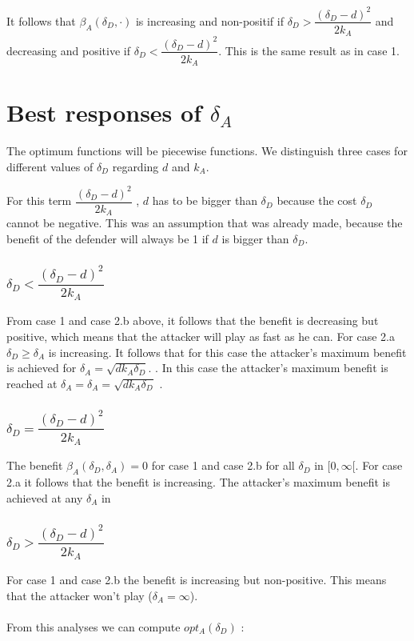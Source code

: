 It follows that $\beta_{A}(\delta_{D},\cdot)$ is increasing and non-positif if $\delta_{D} > \dfrac{(\delta_{D}-d)^{2}}{2k_{A}}$ and decreasing and positive if $\delta_{D} < \dfrac{(\delta_{D}-d)^{2}}{2k_{A}}$. This is the same result as in case 1.\\


\section{Best responses of $\delta_{A}$}
The optimum functions will be piecewise functions. We distinguish three cases for different values of $\delta_{D}$ regarding $d$ and $k_{A}$. 


For this term $\dfrac{(\delta_{D}-d)^{2}}{2k_{A}} $ , $d$ has to be bigger than  $\delta_{D}$ because the cost $\delta_{D}$ cannot be negative. This was an assumption that was already made, because the benefit of the defender will always be 1 if $d$ is bigger than  $\delta_{D}$.

\subsubsection*{$\delta_{D} < \dfrac{(\delta_{D}-d)^{2}}{2k_{A}}$} 
From case 1 and case 2.b above, it follows that the benefit is decreasing but positive, which means that the attacker will play as fast as he can. For case 2.a  $\delta_{D} \geq \delta_{A}$ is increasing. It follows that for this case the attacker's maximum benefit is achieved for $\delta_{A} = \sqrt{d k_{A}\delta_{D}}$.
. In this case the attacker's maximum benefit is reached at $\delta_{A} = \delta_{A} = \sqrt{dk_{A}\delta_{D}}$  .
\subsubsection*{$\delta_{D} = \dfrac{(\delta_{D}-d)^{2}}{2k_{A}}$} 
The benefit $\beta_{A}(\delta_{D},\delta_{A})=0$ for case 1 and case 2.b for all $\delta_{D}$ in $[0, \infty [$. For case 2.a it follows that the benefit is increasing. The attacker's maximum benefit is achieved at any $\delta_{A} $ in 
\subsubsection*{$\delta_{D} > \dfrac{(\delta_{D}-d)^{2}}{2k_{A}}$} 
For case 1 and case 2.b the benefit is increasing but non-positive. This means that the attacker won't play ($\delta_{A} = \infty$). 
\\
~~\\
From this analyses we can compute $opt_{A}(\delta_{D})$ : 

